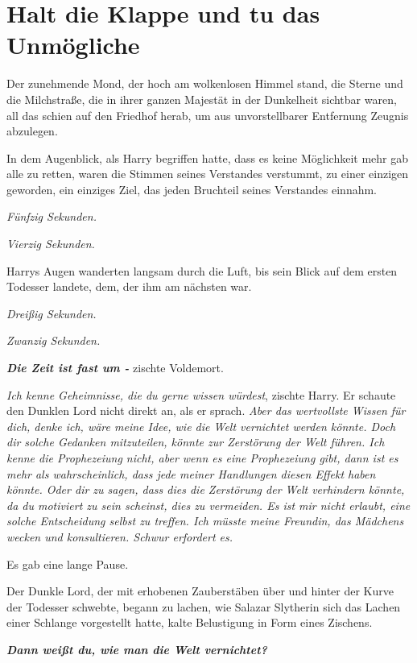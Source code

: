 \chapter{Halt die Klappe und tu das Unmögliche}

Der zunehmende Mond, der hoch am wolkenlosen Himmel stand, die Sterne und die
Milchstraße, die in ihrer ganzen Majestät in der Dunkelheit sichtbar waren, all
das schien auf den Friedhof herab, um aus unvorstellbarer Entfernung Zeugnis
abzulegen.

In dem Augenblick, als Harry begriffen hatte, dass es keine Möglichkeit mehr gab
alle zu retten, waren die Stimmen seines Verstandes verstummt, zu einer einzigen
geworden, ein einziges Ziel, das jeden Bruchteil seines Verstandes einnahm.

\emph{Fünfzig Sekunden.}

\emph{Vierzig Sekunden.}

Harrys Augen wanderten langsam durch die Luft, bis sein Blick auf dem ersten
Todesser landete, dem, der ihm am nächsten war.

\emph{Dreißig Sekunden.}

\emph{Zwanzig Sekunden.}

\glqq{}\textbf{\emph{Die Zeit ist fast um -}}\grqq{} zischte Voldemort.

\glqq{}\emph{Ich kenne Geheimnisse, die du gerne wissen würdest}\grqq{}, zischte
Harry. Er schaute den Dunklen Lord nicht direkt an, als er sprach. \glqq{}
\emph{Aber das wertvollste Wissen für dich, denke ich, wäre meine Idee, wie die
Welt vernichtet werden könnte. Doch dir solche Gedanken mitzuteilen, könnte zur
Zerstörung der Welt führen. Ich kenne die Prophezeiung nicht, aber wenn es eine
Prophezeiung gibt, dann ist es mehr als wahrscheinlich, dass jede meiner
Handlungen diesen Effekt haben könnte. Oder dir zu sagen, dass dies die
Zerstörung der Welt verhindern könnte, da du motiviert zu sein scheinst, dies zu
vermeiden. Es ist mir nicht erlaubt, eine solche Entscheidung selbst zu treffen.
Ich müsste meine Freundin, das Mädchens wecken und konsultieren. Schwur
erfordert es.}\grqq{}

Es gab eine lange Pause.

Der Dunkle Lord, der mit erhobenen Zauberstäben über und hinter der Kurve der
Todesser schwebte, begann zu lachen, wie Salazar Slytherin sich das Lachen einer
Schlange vorgestellt hatte, kalte Belustigung in Form eines Zischens.

\glqq{}\textbf{\emph{Dann weißt du, wie man die Welt vernichtet?}}\grqq{}

